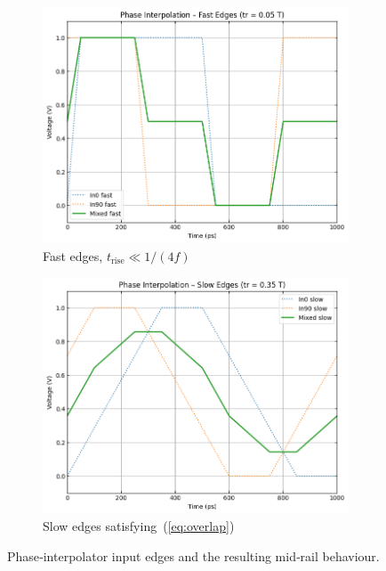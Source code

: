 \begin{figure}[H]
  \centering
  \begin{subfigure}[b]{0.40\linewidth}
    \centering
    \includegraphics[width=\linewidth]{figures/Python/pi_fast_edges.png}
    \caption{Fast edges, $t_{\text{rise}}\!\ll\!1/(4f)$}
    \label{fig:fast}
  \end{subfigure}
  \hfill
  \begin{subfigure}[b]{0.40\linewidth}
    \centering
    \includegraphics[width=\linewidth]{figures/Python/pi_slow_edges.png}
    \caption{Slow edges satisfying (\ref{eq:overlap})}
    \label{fig:slow}
  \end{subfigure}
  \caption{Phase‑interpolator input edges and the resulting
           mid‑rail behaviour.}
  \label{fig:pi_edges}
\end{figure}


